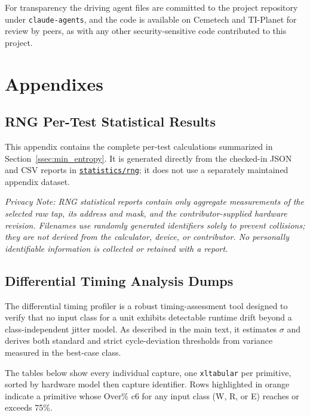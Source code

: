 \documentclass[titlepage]{report}
\renewcommand{\thesection}{\arabic{section}}
\renewcommand{\thesubsection}{\thesection.\arabic{subsection}}
\begin{document}
	For transparency the driving agent files are committed to the project repository under \texttt{claude-agents}, and the code is available on Cemetech and TI-Planet for review by peers, as with any other security-sensitive code contributed to this project.

	\newpage
	\section{Appendixes}
	\setcounter{subsection}{0}
	\renewcommand{\thesubsection}{\Alph{subsection}}

	\subsection{RNG Per-Test Statistical Results}
	\label{ssec:rng_statistical_results}
	This appendix contains the complete per-test calculations summarized in Section~\ref{ssec:min_entropy}. It is generated directly from the checked-in JSON and CSV reports in \href{https://github.com/cagscalclabs/lwip-ce/tree/master/statistics/rng}{\texttt{statistics/rng}}; it does not use a separately maintained appendix dataset.


	\textit{Privacy Note: RNG statistical reports contain only aggregate measurements of the selected raw tap, its address and mask, and the contributor-supplied hardware revision. Filenames use randomly generated identifiers solely to prevent collisions; they are not derived from the calculator, device, or contributor. No personally identifiable information is collected or retained with a report.}

	\newpage
	\subsection{Differential Timing Analysis Dumps}

	The differential timing profiler is a robust timing-assessment tool designed to verify that no input class for a unit exhibits detectable runtime drift beyond a class-independent jitter model. As described in the main text, it estimates $\sigma$ and derives both standard and strict cycle-deviation thresholds from variance measured in the best-case class.

	The tables below show every individual capture, one \texttt{xltabular} per primitive, sorted by hardware model then capture identifier. Rows highlighted in orange indicate a primitive whose Over\% c6 for any input class (W, R, or E) reaches or exceeds 75\%.
\end{document}
